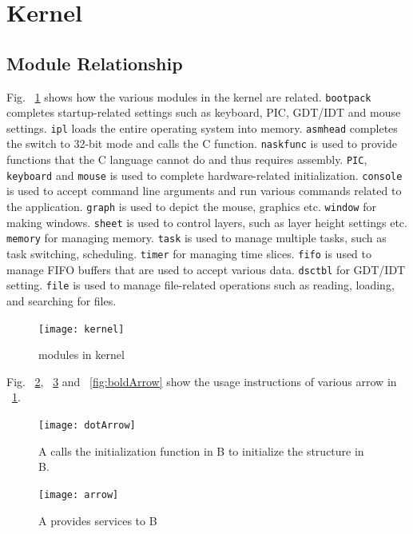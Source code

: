 \documentclass{swfcthesis}
\begin{document}
\section{Kernel}
\label{sec:kernel}

\subsection{Module Relationship}
\label{sec:overview-1}

Fig. ~\ref{fig:kernel} shows how the various modules in
the kernel are related. \texttt{bootpack} completes startup-related settings such as
keyboard, PIC, GDT/IDT and mouse settings. \texttt{ipl} loads the entire operating system
into memory. \texttt{asmhead} completes the switch to 32-bit mode and calls the C
function. \texttt{naskfunc} is used to provide functions that the C language cannot do and
thus requires assembly. \texttt{PIC}, \texttt{keyboard} and \texttt{mouse} is used to
complete hardware-related initialization. \texttt{console} is used to accept command line
arguments and run various commands related to the application. \texttt{graph} is used to
depict the mouse, graphics etc. \texttt{window} for making windows. \texttt{sheet} is used to
control layers, such as layer height settings etc. \texttt{memory} for managing
memory. \texttt{task} is used to manage multiple tasks, such as task switching,
scheduling. \texttt{timer} for managing time slices. \texttt{fifo} is used to manage FIFO buffers
that are used to accept various data. \texttt{dsctbl} for GDT/IDT setting. \texttt{file} is used to
manage file-related operations such as reading, loading, and searching for files. 


\begin{figure}[!htbp]
  \centering
  \texttt{[image: kernel]}
  \caption{modules in kernel}
  \label{fig:kernel}
\end{figure}

Fig. ~\ref{fig:dotArrow}, ~\ref{fig:arrow} and ~\ref{fig:boldArrow} show the usage
instructions of various arrow in ~\ref{fig:kernel}.
\begin{figure}[!htbp]
  \centering
  \texttt{[image: dotArrow]}
  \caption{A calls the initialization function in B to initialize the structure in B.}
  \label{fig:dotArrow}
\end{figure}

\begin{figure}[!htbp]
  \centering
  \texttt{[image: arrow]}
  \caption{A provides services to B}
  \label{fig:arrow}
\end{figure}
\end{document}
